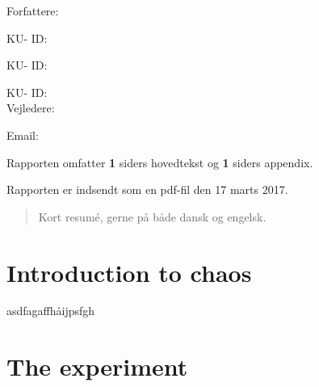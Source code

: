 \documentclass[12pt,oneside,a4paper]{article}
\numberwithin{equation}{section}
\begin{document}
\vfill
{\large Forfattere:}\\
{\large \hspace*{1cm}   \hspace{1cm} KU- ID:  \\
{\large \hspace*{1cm}    \hspace{1cm} KU- ID:  \\
{\large \hspace*{1cm}    \hspace{1cm} KU- ID:  \\

{\large Vejledere:}\\
{\large \hspace*{1cm}   \hspace{1cm} Email:  \\

\vfill

{\large Rapporten omfatter {\bf 1} siders hovedtekst og {\bf 1} siders appendix.}

{\large Rapporten er indsendt som en pdf-fil den 17 marts 2017. }

\normalsize


\newpage
\begin{abstract}
Kort resumé, gerne på både dansk og engelsk.
\end{abstract}

\newpage

\tableofcontents


\newpage
{}
\section{Introduction to chaos}

asdfagaffhåijpsfgh

\section{The experiment}
}}}}
\end{document}

